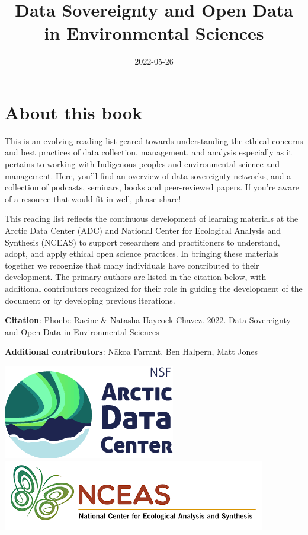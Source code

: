 \documentclass[
]{book}
\title{Data Sovereignty and Open Data in Environmental Sciences}
\author{}
\date{\vspace{-2.5em}2022-05-26}
\begin{document}
\maketitle

{
\setcounter{tocdepth}{1}
\tableofcontents
}
\hypertarget{about-this-book}{%
\chapter*{About this book}\label{about-this-book}}

This is an evolving reading list geared towards understanding the ethical concerns and best practices of data collection, management, and analysis especially as it pertains to working with Indigenous peoples and environmental science and management. Here, you'll find an overview of data sovereignty networks, and a collection of podcasts, seminars, books and peer-reviewed papers. If you're aware of a resource that would fit in well, please share!

This reading list reflects the continuous development of learning materials at the Arctic Data Center (ADC) and National Center for Ecological Analysis and Synthesis (NCEAS) to support researchers and practitioners to understand, adopt, and apply ethical open science practices. In bringing these materials together we recognize that many individuals have contributed to their development. The primary authors are listed in the citation below, with additional contributors recognized for their role in guiding the development of the document or by developing previous iterations.

\textbf{Citation}: Phoebe Racine \& Natasha Haycock-Chavez. 2022. Data Sovereignty and Open Data in Environmental Sciences

\textbf{Additional contributors}: Nākoa Farrant, Ben Halpern, Matt Jones

\includegraphics{images/adc_logo.png}
\includegraphics{images/nceas.png}
\end{document}
